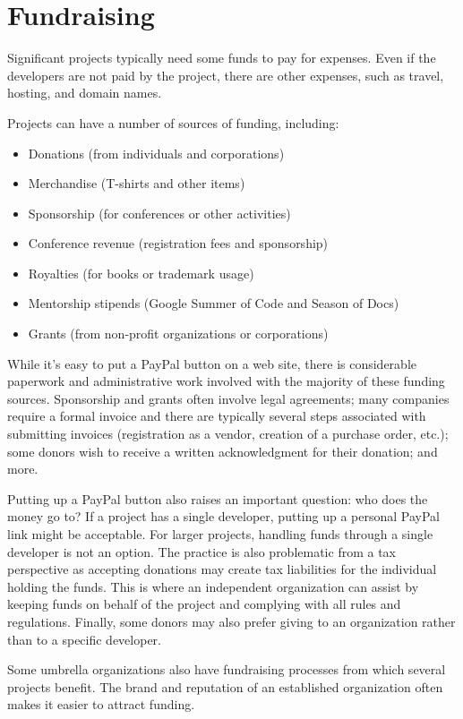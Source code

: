 


\chapter{Fundraising}

Significant projects typically need some funds to pay for expenses.  Even if the developers are not paid by the project, there are other expenses, such as travel, hosting, and domain names.

Projects can have a number of sources of funding, including:

\begin{itemize}

\item Donations (from individuals and corporations)
\item Merchandise (T-shirts and other items)
\item Sponsorship (for conferences or other activities)
\item Conference revenue (registration fees and sponsorship)
\item Royalties (for books or trademark usage)
\item Mentorship stipends (Google Summer of Code and Season of Docs)
\item Grants (from non-profit organizations or corporations)

\end{itemize}

While it's easy to put a PayPal button on a web site, there is considerable paperwork and administrative work involved with the majority of these funding sources.  Sponsorship and grants often involve legal agreements; many companies require a formal invoice and there are typically several steps associated with submitting invoices (registration as a vendor, creation of a purchase order, etc.); some donors wish to receive a written acknowledgment for their donation; and more.

Putting up a PayPal button also raises an important question: who does the money go to?  If a project has a single developer, putting up a personal PayPal link might be acceptable.  For larger projects, handling funds through a single developer is not an option.  The practice is also problematic from a tax perspective as accepting donations may create tax liabilities for the individual holding the funds.  This is where an independent organization can assist by keeping funds on behalf of the project and complying with all rules and regulations.  Finally, some donors may also prefer giving to an organization rather than to a specific developer.

Some umbrella organizations also have fundraising processes from which several projects benefit.  The brand and reputation of an established organization often makes it easier to attract funding.

